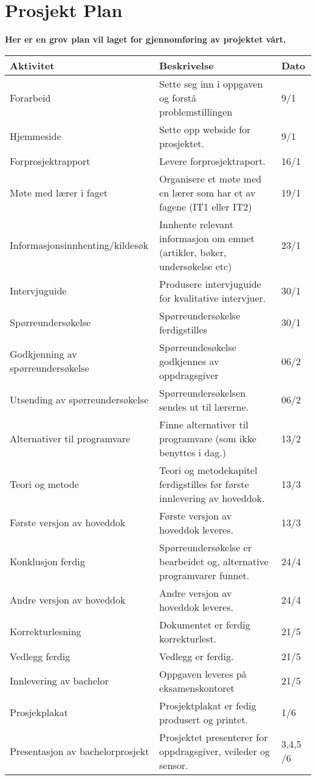 \section{Prosjekt Plan}
\vspace{10pt}
\textbf{Her er en grov plan vil laget for gjennomføring av projektet vårt.}\newline

\newcommand*{\TitleParbox}[1]{\parbox[c]{1.75cm}{\raggedright #1}}%
\begin{tabular}{|m{5cm}|m{5cm}|m{1cm}|}

\hline
\textbf{Aktivitet} & \textbf{Beskrivelse} & \textbf{Dato} \\
\hline
Forarbeid & Sette seg inn i oppgaven og forstå problemstillingen & 9/1 \\
\hline
Hjemmeside & Sette opp webside for prosjektet. & 9/1 \\
\hline
Forprosjektrapport & Levere forprosjektraport. & 16/1 \\
\hline
Møte med lærer i faget & Organisere et møte med en lærer som har et av fagene (IT1 eller IT2) & 19/1 \\
\hline
Informasjonsinnhenting/kildesøk & Innhente relevant informasjon om emnet (artikler, bøker, undersøkelse etc) & 23/1 \\
\hline
Intervjuguide & Produsere intervjuguide for kvalitative intervjuer.& 30/1 \\
\hline
Spørreundersøkelse & Spørreundersøkelse ferdigstilles & 30/1 \\
\hline
Godkjenning av spørreundersøkelse & Spørreundesøkelse godkjennes av oppdragsgiver & 06/2 \\
\hline
Utsending av spørreundersøkelse & Spørreundersøkelsen sendes ut til lærerne. & 06/2 \\
\hline
Alternativer til programvare & Finne alternativer til programvare (som ikke benyttes i dag.) & 13/2 \\
\hline
Teori og metode & Teori og metodekapitel ferdigstilles før første innlevering av hoveddok. & 13/3 \\
\hline
Første versjon av hoveddok & Første versjon av hoveddok leveres.& 13/3 \\
\hline
Konklusjon ferdig & Spørreundersøkelse er bearbeidet og, alternative programvarer funnet.& 24/4 \\
\hline
Andre versjon av hoveddok & Andre versjon av hoveddok leveres. & 24/4 \\
\hline
Korrekturlesning & Dokumentet er ferdig korrekturlest. &  21/5 \\
\hline
Vedlegg ferdig & Vedlegg er ferdig. & 21/5 \\
\hline
Innlevering av bachelor & Oppgaven leveres på eksamenskontoret & 21/5 \\
\hline
Prosjekplakat & Prosjektplakat er fedig produsert og printet. & 1/6 \\
\hline
Presentasjon av bachelorprosjekt & Prosjektet presenterer for oppdragsgiver, veileder og sensor. & 3,4,5 /6 \\
\hline
\end{tabular}

\newpage

